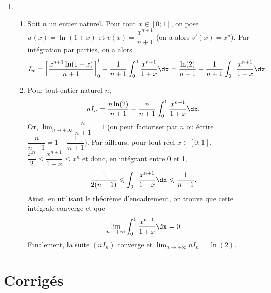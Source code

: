 \documentclass[11pt,fleqn, openany]{book} %
\begin{document}
\begin{solution}
\begin{enumerate}
\begin{enumerate}
\end{enumerate}
\item  \begin{enumerate}
\item  Soit \(n\) un entier naturel. Pour tout \(x\in [0;1]\), on pose \(u(x)=\ln(1+x)\) et \(v(x)=\dfrac{x^{n+1}}{n+1}\) (on a alors \(v'(x)=x^n\)). Par intégration par parties, on a alors
\[I_n = \left[\dfrac{x^{n+1}\ln(1+x)}{n+1}\right]_0^1-\dfrac{1}{n+1}\int_0^1\dfrac{x^{n+1}}{1+x}\dx = \dfrac{\ln(2)}{n+1}-\dfrac{1}{n+1}\int_0^1\dfrac{x^{n+1}}{1+x}\dx .\]
\item  Pour tout entier naturel \(n\),
\[nI_n = \dfrac{n\ln(2)}{n+1}-\dfrac{n}{n+1}\int_0^1\dfrac{x^{n+1}}{1+x}\dx .\] 
Or, \(\displaystyle\lim_{n \to + \infty}\dfrac{n}{n+1}=1\) (on peut factoriser par \(n\) ou écrire \(\dfrac{n}{n+1}=1-\dfrac{1}{n+1}\)). Par ailleurs, pour tout réel \(x\in [0;1]\), \(\dfrac{x^n}{2} \leqslant \dfrac{x^{n+1}}{1+x} \leqslant x^n\) et donc, en intégrant entre 0 et 1,
\[ \dfrac{1}{2(n+1)} \leqslant \int_0^1\dfrac{x^{n+1}}{1+x}\dx \leqslant \dfrac{1}{n+1}.\]
Ainsi, en utilisant le théorème d'encadrement, on trouve que cette intégrale converge et que \[\displaystyle\lim_{n \to + \infty}\int_0^1\dfrac{x^{n+1}}{1+x}\dx =0\] Finalement, la suite \((nI_n)\) converge et \(\displaystyle\lim_{n \to + \infty} nI_n=\ln(2)\).

\end{enumerate}\end{enumerate}

\end{solution}





\chapter{Corrigés}


\printsolutions[headings={false} ]
\end{document}
